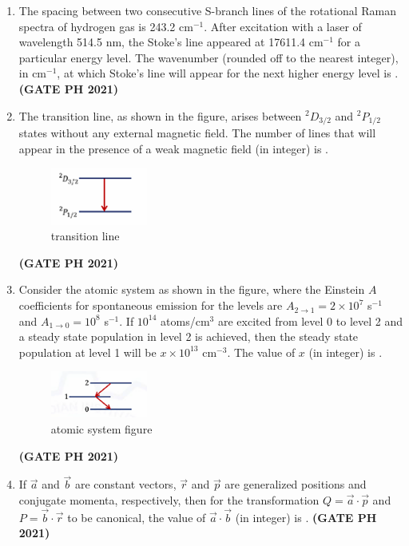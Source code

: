 \documentclass[14pt, a4paper]{extarticle}
\renewcommand{\vec}[1]{\overrightarrow{#1}}
\begin{document}
\begin{enumerate}[label=\textbf{Q.\arabic*}]
\begin{enumerate}[label=\textbf{Q.\arabic*}]
\item The spacing between two consecutive S-branch lines of the rotational Raman spectra of hydrogen gas is 243.2 cm$^{-1}$. After excitation with a laser of wavelength 514.5 nm, the Stoke's line appeared at 17611.4 cm$^{-1}$ for a particular energy level. The wavenumber (rounded off to the nearest integer), in cm$^{-1}$, at which Stoke's line will appear for the next higher energy level is \underline{\hspace{3cm}}.
\hfill \textbf{(GATE PH 2021)}

\item The transition line, as shown in the figure, arises between $^2D_{3/2}$ and $^2P_{1/2}$ states without any external magnetic field. The number of lines that will appear in the presence of a weak magnetic field (in integer) is \underline{\hspace{3cm}}.
\begin{figure}[H]
\centering
\includegraphics[width=0.3\textwidth]{figs/q33fig21.png}
\caption{transition line}
\end{figure}
\hfill \textbf{(GATE PH 2021)}

\item Consider the atomic system as shown in the figure, where the Einstein $A$ coefficients for spontaneous emission for the levels are $A_{2\to1} = 2 \times 10^7$ s$^{-1}$ and $A_{1\to0} = 10^8$ s$^{-1}$. If $10^{14}$ atoms/cm$^3$ are excited from level 0 to level 2 and a steady state population in level 2 is achieved, then the steady state population at level 1 will be $x \times 10^{13}$ cm$^{-3}$. The value of $x$ (in integer) is \underline{\hspace{3cm}}.
\begin{figure}[H]
\centering
\includegraphics[width=0.3\textwidth]{figs/q34fig21.png}
\caption{atomic system figure}
\end{figure}
\hfill \textbf{(GATE PH 2021)}

\item If $\vec{a}$ and $\vec{b}$ are constant vectors, $\vec{r}$ and $\vec{p}$ are generalized positions and conjugate momenta, respectively, then for the transformation $Q = \vec{a} \cdot \vec{p}$ and $P = \vec{b} \cdot \vec{r}$ to be canonical, the value of $\vec{a} \cdot \vec{b}$ (in integer) is \underline{\hspace{3cm}}.
\hfill \textbf{(GATE PH 2021)}


\end{enumerate}
\end{enumerate}
\end{document}
